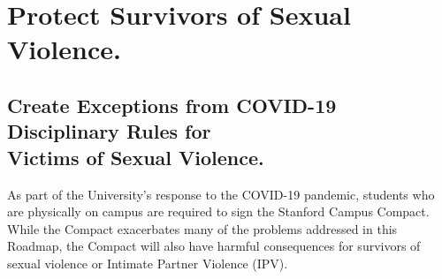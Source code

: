 \documentclass[12pt, titlepage, letterpaper]{article}
\begin{document}







\newpage

\section*{Protect Survivors of Sexual Violence.}
%

\vspace{.5em} %
\hline\hline

\subsection*{Create Exceptions from COVID-19 Disciplinary Rules for \\Victims of Sexual Violence.}
%

As part of the University’s response to the COVID-19 pandemic, students who are physically on campus are required to sign the Stanford Campus Compact. While the Compact exacerbates  many of the problems addressed in this Roadmap, the Compact will also have harmful consequences for survivors of sexual violence or Intimate Partner Violence (IPV). 
\end{document}
